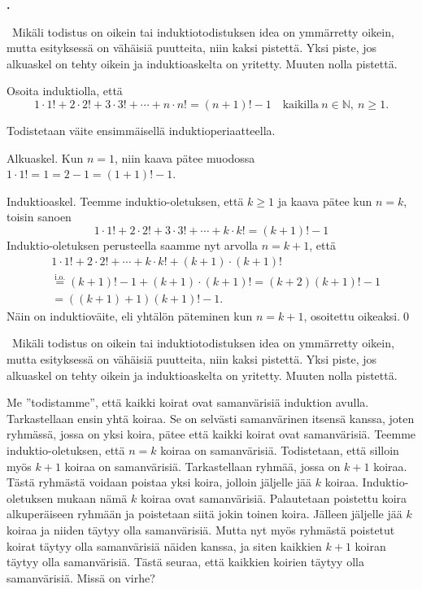 \documentclass[11pt,a4paper,oneside,notitlepage,final]{article}
\newcommand{\N}{\mathbb{N}}
\newcounter{harjnro}
\newenvironment{harjlist}
  {\begin{list}{\kor{\arabic{harjnro}.}}
    {\usecounter{harjnro}
      \setlength{\labelwidth}{0em}
      \setlength{\labelsep}{0.4em}
      \setlength{\leftmargin}{0pt}
      \setlength{\parsep}{5pt}
      \setlength{\itemindent}{0.4em}
      \setlength{\topsep}{0.5\parskip}
      \setlength{\itemsep}{0.75\parskip}
    }
  }
  {\end{list}}
\newcommand{\kor}[1]{\textbf{#1}}
\begin{document}
\begin{harjlist}
\arvostelu \
Mikäli todistus on oikein tai induktiotodistuksen idea on ymmärretty oikein, mutta esityksessä on
vähäisiä puutteita, niin kaksi pistettä. Yksi piste, jos alkuaskel on tehty oikein ja 
induktioaskelta on yritetty. Muuten nolla pistettä.

\item[3.] Osoita induktiolla, että 
\[
1\cdot 1!+2\cdot 2!+3\cdot 3!+\cdots+n\cdot n!=(n+1)!-1\quad\text{kaikilla}\ n\in\N,\ n\geqslant 1.
\]

\vspace{0.4cm}
\ratkaisu
Todistetaan väite ensimmäisellä induktioperiaatteella.

Alkuaskel. Kun $n=1$, niin kaava pätee muodossa $1\cdot 1!=1=2-1=(1+1)!-1$.

Induktioaskel. Teemme induktio-oletuksen, että $k\ge 1$ ja kaava pätee kun $n=k$, toisin sanoen
\[
1\cdot 1!+2\cdot 2!+3\cdot 3!+\cdots+k\cdot k!=(k+1)!-1
\]
Induktio-oletuksen perusteella saamme nyt arvolla $n=k+1$, että
\begin{align*}
&1\cdot 1!+2\cdot 2!+\cdots+k\cdot k!+(k+1)\cdot(k+1)!\\
&\overset{\text{i.o.}}{=}(k+1)!-1+(k+1)\cdot(k+1)!=(k+2)(k+1)!-1\\
&=((k+1)+1)(k+1)!-1.
\end{align*}
Näin on induktioväite, eli yhtälön päteminen kun $n=k+1$, osoitettu oikeaksi.\qed

\arvostelu \
Mikäli todistus on oikein tai induktiotodistuksen idea on ymmärretty oikein, mutta esityksessä on
vähäisiä puutteita, niin kaksi pistettä. Yksi piste, jos alkuaskel on tehty oikein ja 
induktioaskelta on yritetty. Muuten nolla pistettä.

\item[4.] Me
''todistamme'', että kaikki koirat ovat samanvärisiä induktion avulla.
Tarkastellaan ensin yhtä koiraa. Se on selvästi samanvärinen itsensä kanssa, joten ryhmässä, jossa on yksi koira, pätee että kaikki koirat ovat samanvärisiä.
Teemme induktio-oletuksen, että $n = k$ koiraa on samanvärisiä. Todistetaan, että silloin
myös $k + 1$ koiraa on samanvärisiä.
Tarkastellaan ryhmää, jossa on $k+1$ koiraa. Tästä ryhmästä voidaan poistaa yksi koira,
jolloin jäljelle jää $k$ koiraa. Induktio-oletuksen mukaan nämä $k$ koiraa ovat samanvärisiä.
Palautetaan poistettu koira alkuperäiseen ryhmään ja poistetaan siitä jokin toinen koira.
Jälleen jäljelle jää $k$ koiraa ja niiden täytyy olla samanvärisiä. Mutta nyt myös ryhmästä
poistetut koirat täytyy olla samanvärisiä näiden kanssa, ja siten kaikkien $k+1$ koiran täytyy
olla samanvärisiä.
Tästä seuraa, että kaikkien koirien täytyy olla samanvärisiä.
Missä on virhe?


\end{harjlist}
\end{document}
